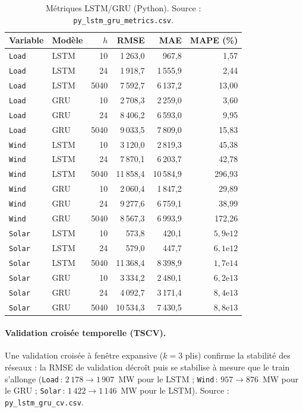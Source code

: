 \begin{table}[H]
\centering
\caption{Métriques LSTM/GRU (Python).
Source : \texttt{py\_lstm\_gru\_metrics.csv}.}
\label{tab:lstm}
\small
\begin{tabular}{llrrrr}
\toprule
Variable & Modèle & $h$ & RMSE & MAE & MAPE (\%) \\
\midrule
\texttt{Load}  & LSTM & 10 & 1\,263{,}0 & 967{,}8 & 1{,}57 \\
\texttt{Load}  & LSTM & 24 & 1\,918{,}7 & 1\,555{,}9 & 2{,}44 \\
\texttt{Load}  & LSTM & 5040 & 7\,592{,}7 & 6\,137{,}2 & 13{,}00 \\
\texttt{Load}  & GRU & 10 & 2\,708{,}3 & 2\,259{,}0 & 3{,}60 \\
\texttt{Load}  & GRU & 24 & 8\,406{,}2 & 6\,593{,}0 & 9{,}95 \\
\texttt{Load}  & GRU & 5040 & 9\,033{,}5 & 7\,809{,}0 & 15{,}83 \\
\texttt{Wind}  & LSTM & 10 & 3\,120{,}0 & 2\,819{,}3 & 45{,}38 \\
\texttt{Wind}  & LSTM & 24 & 7\,870{,}1 & 6\,203{,}7 & 42{,}78 \\
\texttt{Wind}  & LSTM & 5040 & 11\,858{,}4 & 10\,584{,}9 & 296{,}93 \\
\texttt{Wind}  & GRU & 10 & 2\,060{,}4 & 1\,847{,}2 & 29{,}89 \\
\texttt{Wind}  & GRU & 24 & 9\,277{,}6 & 6\,759{,}1 & 38{,}99 \\
\texttt{Wind}  & GRU & 5040 & 8\,567{,}3 & 6\,993{,}9 & 172{,}26 \\
\texttt{Solar} & LSTM & 10 & 573{,}8 & 420{,}1 & $5{,}9\text{e}12$ \\
\texttt{Solar} & LSTM & 24 & 579{,}0 & 447{,}7 & $6{,}1\text{e}12$ \\
\texttt{Solar} & LSTM & 5040 & 11\,368{,}4 & 8\,398{,}9 & $1{,}7\text{e}14$ \\
\texttt{Solar} & GRU & 10 & 3\,334{,}2 & 2\,480{,}1 & $6{,}2\text{e}13$ \\
\texttt{Solar} & GRU & 24 & 4\,092{,}7 & 3\,171{,}4 & $8{,}4\text{e}13$ \\
\texttt{Solar} & GRU & 5040 & 10\,534{,}3 & 7\,430{,}5 & $8{,}8\text{e}13$ \\
\bottomrule
\end{tabular}
\end{table}

\paragraph{Validation croisée temporelle (TSCV).}
Une validation croisée à fenêtre expansive (\(k=3\) plis) confirme la
stabilité des réseaux : la RMSE de validation décroît puis se stabilise à
mesure que le train s'allonge (\texttt{Load}\,: \(2\,178\to1\,907\)~MW pour le
LSTM ; \texttt{Wind}\,: \(957\to876\)~MW pour le GRU ; \texttt{Solar}\,:
\(1\,422\to1\,146\)~MW pour le LSTM). Source :
\texttt{py\_lstm\_gru\_cv.csv}.

